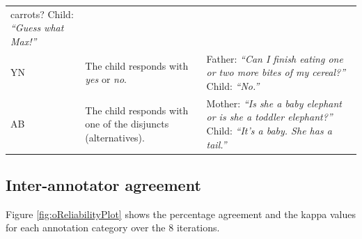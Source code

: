 \documentclass[floatsintext,man]{apa6}
\theoremstyle{definition}
\theoremstyle{definition}
\theoremstyle{definition}
\theoremstyle{remark}
\begin{document}
\begin{longtable}[]{@{}lll@{}}
\begin{minipage}[t]{0.33\columnwidth}
{{carrots?}} Child: \emph{\enquote{Guess what Max!}}\strut
\end{minipage}\tabularnewline
\begin{minipage}[t]{0.18\columnwidth}\raggedright\strut
YN\strut
\end{minipage} & \begin{minipage}[t]{0.41\columnwidth}\raggedright\strut
The child responds with \emph{yes} or \emph{no}.\strut
\end{minipage} & \begin{minipage}[t]{0.33\columnwidth}\raggedright\strut
Father: \emph{\enquote{Can I finish eating one or two more bites of my
cereal?}} Child: \emph{\enquote{No.}}\strut
\end{minipage}\tabularnewline
\begin{minipage}[t]{0.18\columnwidth}\raggedright\strut
AB\strut
\end{minipage} & \begin{minipage}[t]{0.41\columnwidth}\raggedright\strut
The child responds with one of the disjuncts (alternatives).\strut
\end{minipage} & \begin{minipage}[t]{0.33\columnwidth}\raggedright\strut
Mother: \emph{\enquote{Is she a baby elephant or is she a toddler
elephant?}} Child: \emph{\enquote{It's a baby. She has a tail.}}\strut
\end{minipage}\tabularnewline
\bottomrule
\end{longtable}

\subsection{Inter-annotator agreement}\label{inter-annotator-agreement}

Figure \ref{fig:oReliabilityPlot} shows the percentage agreement and the
kappa values for each annotation category over the 8 iterations.
\end{document}
